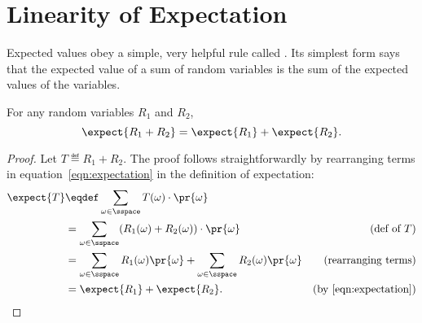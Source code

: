 \begin{problems}
\practiceproblems
{}

\classproblems
{}

\examproblems
{}

\homeworkproblems
{}
\end{problems}


\section{Linearity of Expectation}\label{finlin}

Expected values obey a simple, very helpful rule called
.  Its simplest form says that the
expected value of a sum of random variables is the sum of the expected
values of the variables.

\begin{theorem}\label{expsum-2}
For any random variables $R_1$ and $R_2$,
\[
\expect{R_1 + R_2} = \expect{R_1} + \expect{R_2}.
\]
\end{theorem}

\begin{proof}
Let $T \eqdef R_1+R_2$.  The proof follows straightforwardly by
rearranging terms in equation~\eqref{eqn:expectation} in the
definition of expectation:
\begin{align*}
\expect{T}
     & \eqdef \sum_{\omega \in \sspace} T(\omega) \cdot \pr{\omega}\\
        & = \sum_{\omega \in \sspace} (R_1(\omega) + R_2(\omega)) \cdot \pr{\omega}
                         & \text{(def of $T$)}\\
        & = \sum_{\omega \in \sspace} R_1(\omega) \pr{\omega} + 
              \sum_{\omega \in \sspace} R_2(\omega) \pr{\omega} & \text{(rearranging terms)}\\
        & = \expect{R_1} + \expect{R_2}.
                & \text{(by~\eqref{eqn:expectation})}
\end{align*}
\end{proof}

